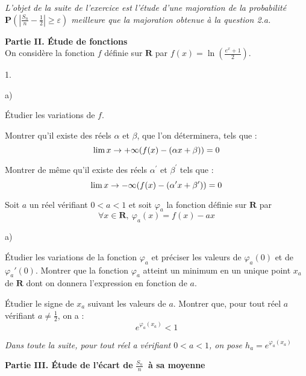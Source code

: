 \documentclass[11pt]{article}%
\begin{document}
\emph{L'objet de la suite de l'exercice est l'étude d'une
majoration de la probabilité $\mathbf{P}\left( \left|
\frac{S_{n}}{n}-\frac{1}{2}\right| \geq \varepsilon \right) $ meilleure
que la
majoration obtenue à la question 2.a.}

\textbf{Partie II. Étude de fonctions}\\
On considère la fonction $f$ définie sur $\mathbf{R}$ par $f(x) = \ln
\left( \frac{e^{x} + 1}{2}\right) $.

\begin{noliste}{1.}
 \setlength{\itemsep}{4mm}
\item 
\begin{noliste}{a)}
 \setlength{\itemsep}{2mm}
\item {Étudier les variations de $f$. }

\item {Montrer qu'il existe des réels $\alpha $ et $\beta $, que l'on
déterminera, tels que : 
\[
\lim{x\to + \infty }(f(x)-(\alpha x + \beta )) = 0
\]
}

\item {Montrer de même qu'il existe des réels $\alpha ^{\prime }$ et
$\beta
^{\prime }$ tels que : 
\[
\lim{x\to -\infty }(f(x)-(\alpha ^{\prime }x + \beta ^{\prime })) = 0
\]
}
\end{noliste}

\item {Soit $a$ un réel vérifiant $0<a<1$ et soit $\varphi_{a}$ la
fonction définie sur $\mathbf{R}$ par 
\[
\forall x\in \mathbf{R},\ \varphi_{a}(x) = f(x)-ax
\]
}

\begin{noliste}{a)}
 \setlength{\itemsep}{2mm}
\item {Étudier les variations de la fonction $\varphi_{a}$ et préciser
les valeurs de $\varphi_{a}(0)$ et de $\varphi_{a}{\prime }(0)$.
Montrer
que la fonction $\varphi_{a}$ atteint un minimum en un unique point
$x_{a}$
de $\mathbf{R}$ dont on donnera l'expression en fonction de $a$. }

\item {Étudier le signe de $x_{a}$ suivant les valeurs de $a$. Montrer
que, pour tout réel $a$ vérifiant $a\ne \frac{1}{2}$, on a : 
\[
e^{\varphi_{a}(x_{a})}<1
\]
}
\end{noliste}
\end{noliste}

\emph{Dans toute la suite, pour tout réel a vérifiant $0<a<1$, on
pose $h_{a} = e^{\varphi_{a}(x_{a})}$}

\textbf{Partie III. Étude de l'écart de \boldmath
}$\frac{S_{n}}{n}$\textbf{\unboldmath\ à sa moyenne}
\end{document}
